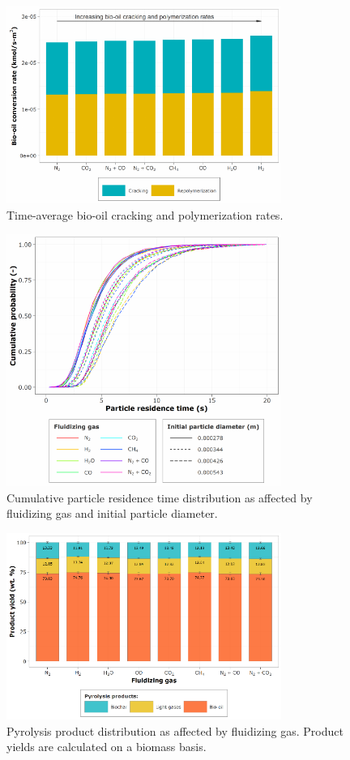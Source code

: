 \begin{figure}[H]
    \centering
    \includegraphics[width=0.8\textwidth]{figures/cfd-biooil.pdf}
    \caption{Time-average bio-oil cracking and polymerization rates.}
    \label{fig:cfd-biooil}
\end{figure}

\begin{figure}[H]
    \centering
    \includegraphics[width=0.8\textwidth]{figures/cfd-particle-time.pdf}
    \caption{Cumulative particle residence time distribution as affected by fluidizing gas and initial particle diameter.}
    \label{fig:cfd-particle-time}
\end{figure}

\begin{figure}[H]
    \centering
    \includegraphics[width=0.8\textwidth]{figures/cfd-yields.pdf}
    \caption{Pyrolysis product distribution as affected by fluidizing gas. Product yields are calculated on a biomass basis.}
    \label{fig:cfd-yields}
\end{figure}
